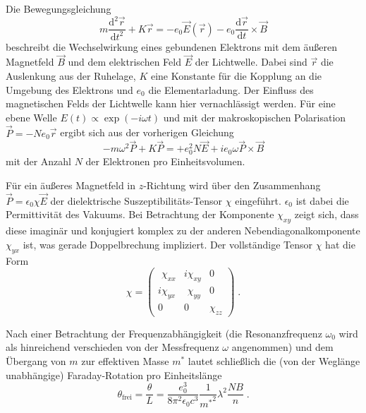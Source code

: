 Die Bewegungsgleichung
\begin{equation*}
    m \frac{\mathrm{d}^2 \vec r}{\mathrm{d} t^2} + K \vec r
    = - e_0 \vec E(\vec r) - e_0 \frac{\mathrm{d} \vec r}{\mathrm{d} t} \times \vec B
\end{equation*}
beschreibt die Wechselwirkung eines gebundenen Elektrons mit dem äußeren Magnetfeld $\vec B$ und dem elektrischen Feld $\vec E$ der Lichtwelle.
Dabei sind
    $\vec r$ die Auslenkung aus der Ruhelage,
    $K$ eine Konstante für die Kopplung an die Umgebung des Elektrons
    und $e_0$ die Elementarladung.
Der Einfluss des magnetischen Felds der Lichtwelle kann hier vernachlässigt werden.
%
    Für eine ebene Welle $E(t) \propto \exp(-i \omega t)$
    und mit der makroskopischen Polarisation $\vec P = -N e_0 \vec r$
ergibt sich aus der vorherigen Gleichung
\begin{equation*}
    -m \omega^2 \vec P + K \vec P
    = + e_0^2 N \vec E + i e_0 \omega \vec P \times \vec B
\end{equation*}
mit der Anzahl $N$ der Elektronen pro Einheitsvolumen.

Für ein äußeres Magnetfeld in $z$-Richtung wird
    über den Zusammenhang $\vec P = \epsilon_0 \chi \vec E$
der dielektrische Suszeptibilitäts-Tensor $\chi$ eingeführt.
$\epsilon_0$ ist dabei die Permittivität des Vakuums.
Bei Betrachtung der Komponente $\chi_{xy}$ zeigt sich,
dass diese
    imaginär
    und konjugiert komplex zu der anderen Nebendiagonalkomponente $\chi_{yx}$
ist,
was gerade Doppelbrechung impliziert.
Der vollständige Tensor $\chi$ hat die Form
\begin{equation*}
    \chi = \begin{pmatrix}
        \phantom{i}\chi_{xx} & i\chi_{xy} & 0 \\
        i\chi_{yx} & \phantom{i}\chi_{yy} & 0 \\
        0 & 0 & \chi_{zz}
    \end{pmatrix} \; .
\end{equation*}

Nach
    einer Betrachtung der Frequenzabhängigkeit
        (die Resonanzfrequenz $\omega_0$ wird als hinreichend verschieden von der Messfrequenz $\omega$ angenommen)
    und dem Übergang von $m$ zur effektiven Masse $m^*$
lautet schließlich
die (von der Weglänge unabhängige) Faraday-Rotation pro Einheitslänge
\begin{equation}
    \theta_\text{frei}
    = \frac{\theta}{L}
    = \frac{e_0^3}{8 \pi^2 \epsilon_0 c^3} \frac{1}{{m^*}^2} \lambda^2 \frac{N B}{n} \; .
    \label{eqn:theta_frei}
\end{equation}



